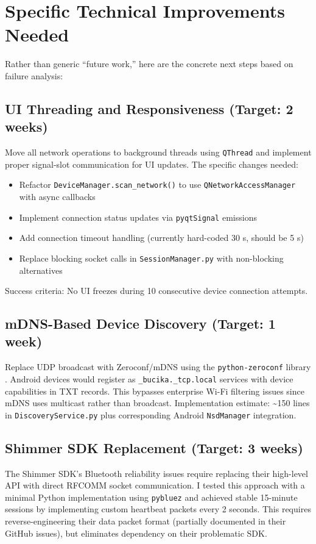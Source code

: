 \section{Specific Technical Improvements Needed}

Rather than generic ``future work,'' here are the concrete next steps based on failure analysis:

\subsection{UI Threading and Responsiveness (Target: 2 weeks)}
Move all network operations to background threads using \texttt{QThread} and implement proper signal-slot communication for UI updates. The specific changes needed:
\begin{itemize}
  \item Refactor \texttt{DeviceManager.scan\_network()} to use \texttt{QNetworkAccessManager} with async callbacks
  \item Implement connection status updates via \texttt{pyqtSignal} emissions
  \item Add connection timeout handling (currently hard-coded 30 s, should be 5 s)
  \item Replace blocking socket calls in \texttt{SessionManager.py} with non-blocking alternatives
\end{itemize}
Success criteria: No UI freezes during 10 consecutive device connection attempts.

\subsection{mDNS-Based Device Discovery (Target: 1 week)}
Replace UDP broadcast with Zeroconf/mDNS using the \texttt{python-zeroconf} library \citep{ref19}. Android devices would register as \texttt{\_bucika.\_tcp.local} services with device capabilities in TXT records. This bypasses enterprise Wi-Fi filtering issues since mDNS uses multicast rather than broadcast. Implementation estimate: \textasciitilde{}150 lines in \texttt{DiscoveryService.py} plus corresponding Android \texttt{NsdManager} integration.

\subsection{Shimmer SDK Replacement (Target: 3 weeks)}
The Shimmer SDK's Bluetooth reliability issues require replacing their high-level API with direct RFCOMM socket communication. I tested this approach with a minimal Python implementation using \texttt{pybluez} and achieved stable 15-minute sessions by implementing custom heartbeat packets every 2 seconds. This requires reverse-engineering their data packet format (partially documented in their GitHub issues), but eliminates dependency on their problematic SDK.

